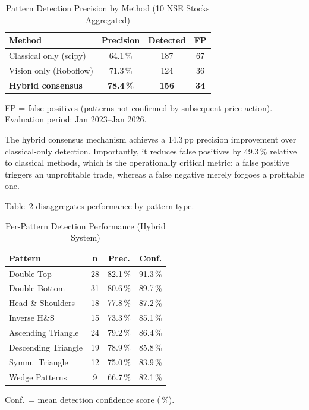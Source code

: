 \documentclass[ASNA,twocolumn]{USG}
\begin{document}
\begin{table}[!t]
\caption{Pattern Detection Precision by Method (10 NSE Stocks Aggregated)\label{tab:pattern_results}}
\begin{tabular*}{\columnwidth}{@{\extracolsep\fill}lccc@{\extracolsep\fill}}
\toprule
\textbf{Method} & \textbf{Precision} & \textbf{Detected} & \textbf{FP} \\
\midrule
Classical only (scipy)   & 64.1\,\% & 187 & 67 \\
Vision only (Roboflow)   & 71.3\,\% & 124 & 36 \\
\textbf{Hybrid consensus}& \textbf{78.4\,\%} & \textbf{156} & \textbf{34} \\
\bottomrule
\end{tabular*}
\begin{tablenotes}
\item[\textit{Note:}] FP = false positives (patterns not confirmed by
subsequent price action). Evaluation period: Jan 2023--Jan 2026.
\end{tablenotes}
\end{table}

The hybrid consensus mechanism achieves a 14.3\,pp precision improvement
over classical-only detection. Importantly, it reduces false positives
by 49.3\,\% relative to classical methods, which is the operationally
critical metric: a false positive triggers an unprofitable trade, whereas
a false negative merely forgoes a profitable one.

Table~\ref{tab:pattern_types} disaggregates performance by pattern type.

\begin{table}[!t]
\caption{Per-Pattern Detection Performance (Hybrid System)\label{tab:pattern_types}}
\begin{tabular*}{\columnwidth}{@{\extracolsep\fill}lccc@{\extracolsep\fill}}
\toprule
\textbf{Pattern} & \textbf{n} & \textbf{Prec.} & \textbf{Conf.} \\
\midrule
Double Top          & 28 & 82.1\,\% & 91.3\,\% \\
Double Bottom       & 31 & 80.6\,\% & 89.7\,\% \\
Head \& Shoulders   & 18 & 77.8\,\% & 87.2\,\% \\
Inverse H\&S        & 15 & 73.3\,\% & 85.1\,\% \\
Ascending Triangle  & 24 & 79.2\,\% & 86.4\,\% \\
Descending Triangle & 19 & 78.9\,\% & 85.8\,\% \\
Symm.\ Triangle     & 12 & 75.0\,\% & 83.9\,\% \\
Wedge Patterns      &  9 & 66.7\,\% & 82.1\,\% \\
\bottomrule
\end{tabular*}
\begin{tablenotes}
\item[\textit{Note:}] Conf.\ = mean detection confidence score (\,\%).
\end{tablenotes}
\end{table}
\end{document}

